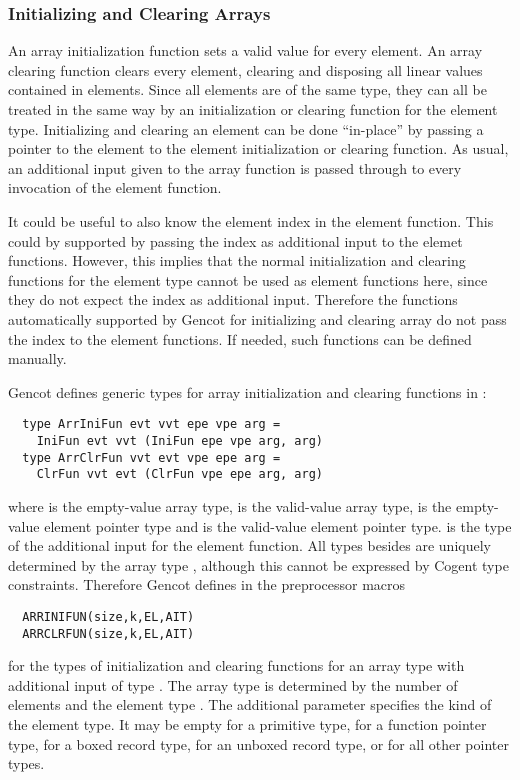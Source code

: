 \subsubsection{Initializing and Clearing Arrays}

An array initialization function sets a valid value for every element. An array clearing function clears every element, 
clearing and disposing all linear values contained in elements. Since all elements are of the same type, they can all be
treated in the same way by an initialization or clearing function for the element type. Initializing and clearing an element
can be done ``in-place'' by passing a pointer to the element to the element initialization or clearing function. As usual,
an additional input given to the array function is passed through to every invocation of the element function. 

It could be useful to also know the element index in the element function. This could by supported by passing the index
as additional input to the elemet functions. However, this implies that the normal initialization and clearing functions
for the element type cannot be used as element functions here, since they do not expect the index as additional input.
Therefore the functions automatically supported by Gencot for initializing and clearing array do not pass the index 
to the element functions. If needed, such functions can be defined manually.

Gencot defines generic types for array initialization and clearing functions in :
\begin{verbatim}
  type ArrIniFun evt vvt epe vpe arg =
    IniFun evt vvt (IniFun epe vpe arg, arg)
  type ArrClrFun vvt evt vpe epe arg =
    ClrFun vvt evt (ClrFun vpe epe arg, arg)
\end{verbatim}
where  is the empty-value array type,  is the valid-value array type,  is the empty-value
element pointer type and  is the valid-value element pointer type. 
is the type of the additional input for the element function. All types besides  are uniquely determined by the 
array type , although this cannot be expressed by Cogent type constraints. Therefore Gencot  defines in 
 the preprocessor macros
\begin{verbatim}
  ARRINIFUN(size,k,EL,AIT)
  ARRCLRFUN(size,k,EL,AIT)
\end{verbatim}
for the types of initialization and clearing functions for an array type  with additional input of type .
The array type  is determined by the number of elements  and the element type 
. The additional parameter  specifies the kind of the element type. It may be empty for a primitive type,
 for a function pointer type,  for a boxed record type,  for an unboxed record type, or  for 
all other pointer types. 

